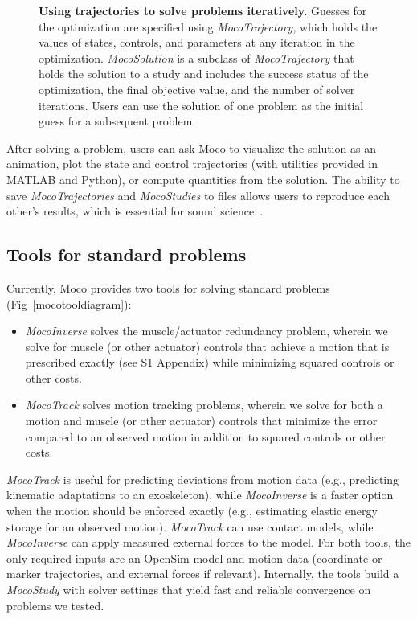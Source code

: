 \documentclass[10pt,letterpaper]{article}
\begin{document}
\begin{figure}[!h]
    \centering
    \caption{{\bf Using trajectories to solve problems iteratively.}
        Guesses for the optimization are specified using \textit{MocoTrajectory}, which holds the values of states, controls, and parameters at any iteration in the optimization. \textit{MocoSolution} is a subclass of \textit{MocoTrajectory} that holds the solution to a study and includes the success status of the optimization, the final objective value, and the number of solver iterations. Users can use the solution of one problem as the initial guess for a subsequent problem.}
    \label{mocosolverdiagram}
\end{figure}

After solving a problem, users can ask Moco to visualize the solution as an animation, plot the state and control trajectories (with utilities provided in MATLAB and Python), or compute quantities from the solution. The ability to save \textit{MocoTrajectories} and \textit{MocoStudies} to files allows users to reproduce each other's results, which is essential for sound science~\cite{Peng:2011}.

\subsection*{Tools for standard problems}

Currently, Moco provides two tools for solving standard problems (Fig~\ref{mocotooldiagram}):
\begin{itemize}
\item \textit{MocoInverse} solves the muscle/actuator redundancy problem, wherein we solve for muscle (or other actuator) controls that achieve a motion that is prescribed exactly (see S1 Appendix) while minimizing squared controls or other costs.
\item \textit{MocoTrack} solves motion tracking problems, wherein we solve for both a motion and muscle (or other actuator) controls that minimize the error compared to an observed motion in addition to squared controls or other costs.
\end{itemize}
\textit{MocoTrack} is useful for predicting deviations from motion data (e.g., predicting kinematic adaptations to an exoskeleton), while \textit{MocoInverse} is a faster option when the motion should be enforced exactly (e.g., estimating elastic energy storage for an observed motion). \textit{MocoTrack} can use contact models, while \textit{MocoInverse} can apply measured external forces to the model. For both tools, the only required inputs are an OpenSim model and motion data (coordinate or marker trajectories, and external forces if relevant). Internally, the tools build a \textit{MocoStudy} with solver settings that yield fast and reliable convergence on problems we tested.
\end{document}
